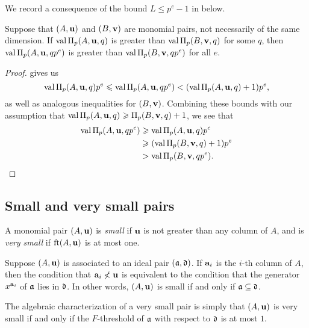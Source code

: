 \documentclass[11pt]{amsart}
\begin{document}
We record a consequence of the bound $L \leq p^e-1$ in  below.

\begin{corollary}
   \label{cor: mu comparison}
   Suppose that $(A,\mathbf{u})$ and $(B,\mathbf{v})$ are monomial pairs, not necessarily of the same dimension.  
   If $\operatorname{val} \Pi_p(A, \mathbf{u}, q)$ is greater than $\operatorname{val} \Pi_p(B, \mathbf{v}, q)$ for some $q$, then $\operatorname{val} \Pi_p(A, \mathbf{u}, qp^e)$ is greater than $\operatorname{val} \Pi_p(B, \mathbf{v}, qp^e)$ for all $e$.
\end{corollary}

\begin{proof}
    gives us
   \begin{equation*}
      \operatorname{val} \Pi_p(A, \mathbf{u},q)p^e \leqslant \operatorname{val} \Pi_p(A, \mathbf{u}, qp^e) < (\operatorname{val} \Pi_p(A, \mathbf{u}, q)+1)p^e,
   \end{equation*}
   as well as analogous inequalities for $(B,\mathbf{v})$.
   Combining these bounds with our assumption that $\operatorname{val} \Pi_p(A, \mathbf{u}, q) \geqslant \Pi_p(B, \mathbf{v}, q) + 1$, we see that
   \begin{align*}
     \operatorname{val} \Pi_p(A, \mathbf{u}, qp^e)  &\geqslant \operatorname{val} \Pi_p(A, \mathbf{u}, q)  p^e \\
                                  &\geqslant (\operatorname{val} \Pi_p(B, \mathbf{v}, q)+1) p^e \\
                                  & > \operatorname{val} \Pi_p(B, \mathbf{v}, qp^e). \qedhere
   \end{align*}
\end{proof}

\subsection{Small and very small pairs}

\begin{definition}
A monomial pair $(A, \mathbf{u})$ is \emph{small} if $\mathbf{u}$ is not greater than any column of $A$, and is \emph{very small} if $\operatorname{ft}(A, \mathbf{u})$ is at most one. 
\end{definition}

\begin{remark}
\label{algebraic small and very small: R}
  Suppose $(A, \mathbf{u})$ is associated to an ideal pair $(\mathfrak{a}, \mathfrak{d})$.  If $\mathbf{a}_i$ is the $i$-th column of $A$, then the condition that $\mathbf{a}_i \not < \mathbf{u}$ is equivalent to the condition that the generator $x^{\mathbf{a}_i}$ of $\mathfrak{a}$ lies in $\mathfrak{d}$.  In other words, $(A, \mathbf{u})$ is small if and only if $\mathfrak{a} \subseteq \mathfrak{d}$.

The algebraic characterization of a very small pair is simply that $(A, \mathbf{u})$ is very small if and only if the $F$-threshold of $\mathfrak{a}$ with respect to $\mathfrak{d}$ is at most $1$.
\end{remark}
\end{document}
